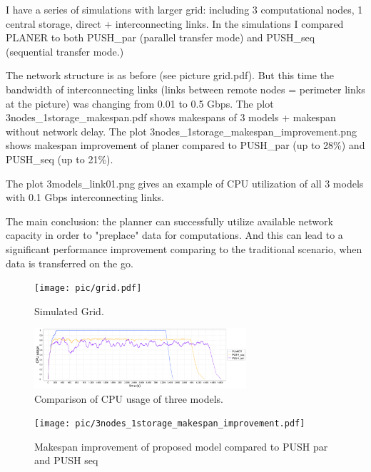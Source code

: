 \documentclass{svjour3}                     %
\begin{document}
I have a series of simulations with larger grid: including 3 computational nodes, 1 central storage, direct + interconnecting links. In the simulations I compared PLANER to both PUSH\_par (parallel transfer mode) and PUSH\_seq (sequential transfer mode.)

The network structure is as before (see picture grid.pdf). But this time the bandwidth of interconnecting links (links between remote nodes = perimeter links at the picture) was changing from 0.01 to 0.5 Gbps. 
The plot 3nodes\_1storage\_makespan.pdf shows makespans of 3 models + makespan without network delay.
The plot 3nodes\_1storage\_makespan\_improvement.png shows makespan improvement of planer compared to PUSH\_par (up to 28\%) and PUSH\_seq (up to 21\%).

The plot 3models\_link01.png gives an example of CPU utilization of all 3 models with 0.1 Gbps interconnecting links.

The main conclusion: the planner can successfully  utilize available network capacity in order to "preplace" data for computations. And this can lead to a significant performance improvement comparing to the traditional scenario, when data is transferred on the go. 

\begin{figure}[h]
  \begin{center}
    \texttt{[image: pic/grid.pdf]}
    \caption{Simulated Grid.}
  \end{center}  
  \label{simulated_grid}	
\end{figure}

\begin{figure}[h]
  \begin{center}
    \includegraphics [trim= 0mm 00mm 0mm 00mm , clip,       	width=0.7\textwidth]{pic/3models_link01.png}
    \caption{Comparison of CPU usage of three models. }
  \end{center}  
  \label{multi_cpu_consumption}	
\end{figure}

\begin{figure}[h]
  \begin{center}
    \texttt{[image: pic/3nodes\_1storage\_makespan\_improvement.pdf]}
    \caption{Makespan improvement of proposed model compared to PUSH par and PUSH seq}
  \end{center}  
  \label{multi_makespan_compare}	
\end{figure}
\end{document}
